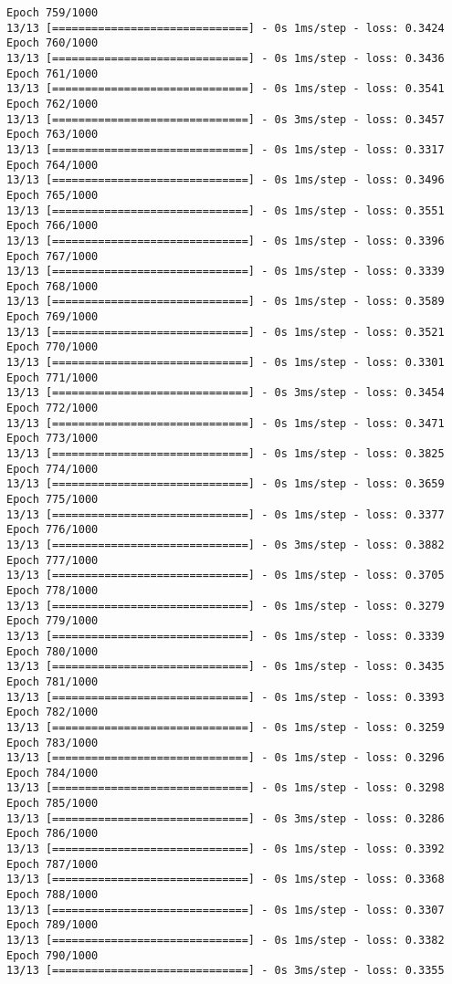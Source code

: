\documentclass[11pt]{article}
\begin{document}
\begin{Verbatim}[commandchars=\\\{\}]
Epoch 759/1000
13/13 [==============================] - 0s 1ms/step - loss: 0.3424
Epoch 760/1000
13/13 [==============================] - 0s 1ms/step - loss: 0.3436
Epoch 761/1000
13/13 [==============================] - 0s 1ms/step - loss: 0.3541
Epoch 762/1000
13/13 [==============================] - 0s 3ms/step - loss: 0.3457
Epoch 763/1000
13/13 [==============================] - 0s 1ms/step - loss: 0.3317
Epoch 764/1000
13/13 [==============================] - 0s 1ms/step - loss: 0.3496
Epoch 765/1000
13/13 [==============================] - 0s 1ms/step - loss: 0.3551
Epoch 766/1000
13/13 [==============================] - 0s 1ms/step - loss: 0.3396
Epoch 767/1000
13/13 [==============================] - 0s 1ms/step - loss: 0.3339
Epoch 768/1000
13/13 [==============================] - 0s 1ms/step - loss: 0.3589
Epoch 769/1000
13/13 [==============================] - 0s 1ms/step - loss: 0.3521
Epoch 770/1000
13/13 [==============================] - 0s 1ms/step - loss: 0.3301
Epoch 771/1000
13/13 [==============================] - 0s 3ms/step - loss: 0.3454
Epoch 772/1000
13/13 [==============================] - 0s 1ms/step - loss: 0.3471
Epoch 773/1000
13/13 [==============================] - 0s 1ms/step - loss: 0.3825
Epoch 774/1000
13/13 [==============================] - 0s 1ms/step - loss: 0.3659
Epoch 775/1000
13/13 [==============================] - 0s 1ms/step - loss: 0.3377
Epoch 776/1000
13/13 [==============================] - 0s 3ms/step - loss: 0.3882
Epoch 777/1000
13/13 [==============================] - 0s 1ms/step - loss: 0.3705
Epoch 778/1000
13/13 [==============================] - 0s 1ms/step - loss: 0.3279
Epoch 779/1000
13/13 [==============================] - 0s 1ms/step - loss: 0.3339
Epoch 780/1000
13/13 [==============================] - 0s 1ms/step - loss: 0.3435
Epoch 781/1000
13/13 [==============================] - 0s 1ms/step - loss: 0.3393
Epoch 782/1000
13/13 [==============================] - 0s 1ms/step - loss: 0.3259
Epoch 783/1000
13/13 [==============================] - 0s 1ms/step - loss: 0.3296
Epoch 784/1000
13/13 [==============================] - 0s 1ms/step - loss: 0.3298
Epoch 785/1000
13/13 [==============================] - 0s 3ms/step - loss: 0.3286
Epoch 786/1000
13/13 [==============================] - 0s 1ms/step - loss: 0.3392
Epoch 787/1000
13/13 [==============================] - 0s 1ms/step - loss: 0.3368
Epoch 788/1000
13/13 [==============================] - 0s 1ms/step - loss: 0.3307
Epoch 789/1000
13/13 [==============================] - 0s 1ms/step - loss: 0.3382
Epoch 790/1000
13/13 [==============================] - 0s 3ms/step - loss: 0.3355

\end{Verbatim}
\end{document}
